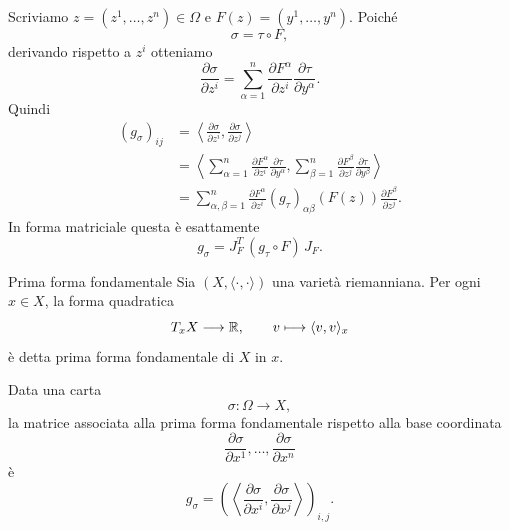 \documentclass[a4paper]{article}
\begin{document}
\begin{snippetproof}{}
Scriviamo \(z=(z^1,\ldots,z^n)\in\Omega\) e \(F(z)=(y^1,\ldots,y^n)\). Poiché
\[
    \sigma=\tau\circ F,
\]
derivando rispetto a \(z^i\) otteniamo
\[
    \frac{\partial\sigma}{\partial z^i}
    =
    \sum_{\alpha=1}^{n}
    \frac{\partial F^\alpha}{\partial z^i}
    \frac{\partial\tau}{\partial y^\alpha}.
\]
Quindi
\begin{align*}
    (g_\sigma)_{ij}
    &=
    \left\langle
        \frac{\partial\sigma}{\partial z^i},
        \frac{\partial\sigma}{\partial z^j}
    \right\rangle\\
    &=
    \left\langle
        \sum_{\alpha=1}^{n}
        \frac{\partial F^\alpha}{\partial z^i}
        \frac{\partial\tau}{\partial y^\alpha},
        \sum_{\beta=1}^{n}
        \frac{\partial F^\beta}{\partial z^j}
        \frac{\partial\tau}{\partial y^\beta}
    \right\rangle\\
    &=
    \sum_{\alpha,\beta=1}^{n}
    \frac{\partial F^\alpha}{\partial z^i}
    (g_\tau)_{\alpha\beta}(F(z))
    \frac{\partial F^\beta}{\partial z^j}.
\end{align*}
In forma matriciale questa è esattamente
\[
    g_\sigma
    =
    J_F^T\,(g_\tau\circ F)\,J_F.
\]
\end{snippetproof}

\begin{snippetdefinition}{Prima forma fondamentale}
Sia \((X,\langle\cdot,\cdot\rangle)\) una varietà riemanniana. Per ogni \(x\in X\), la forma quadratica
\[
    T_xX\longrightarrow \mathbb{R},
    \qquad
    v\longmapsto \langle v,v\rangle_x
\]
è detta prima forma fondamentale di \(X\) in \(x\).

Data una carta
\[
    \sigma:\Omega\longrightarrow X,
\]
la matrice associata alla prima forma fondamentale rispetto alla base coordinata
\[
    \frac{\partial\sigma}{\partial x^1},
    \ldots,
    \frac{\partial\sigma}{\partial x^n}
\]
è
\[
    g_\sigma
    =
    \left(
        \left\langle
            \frac{\partial\sigma}{\partial x^i},
            \frac{\partial\sigma}{\partial x^j}
        \right\rangle
    \right)_{i,j}.
\]
\end{snippetdefinition}
\end{document}
